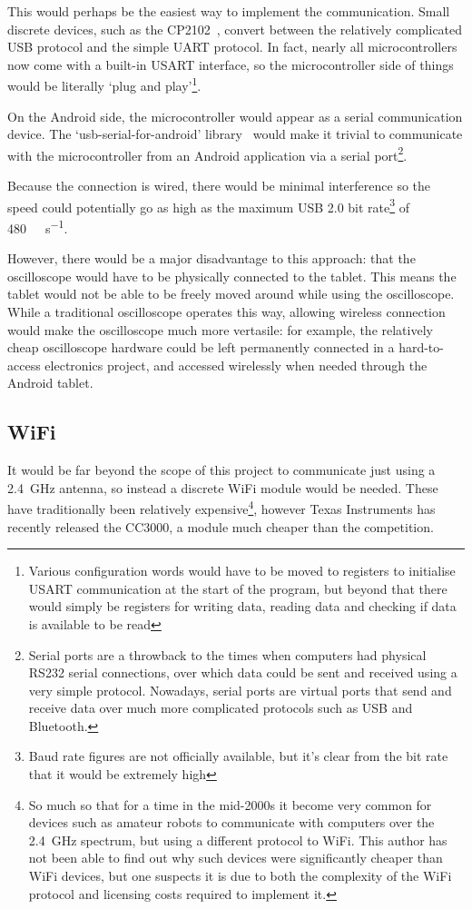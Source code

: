 This would perhaps be the easiest way to implement the communication. Small
discrete devices, such as the CP2102~\autocite{CP2102}, convert between the
relatively complicated USB protocol and the simple UART protocol. In fact,
nearly all microcontrollers now come with a built-in USART interface, so the
microcontroller side of things would be literally `plug and
play'\footnote{Various configuration words would have to be moved to registers
to initialise USART communication at the start of the program, but beyond that
there would simply be registers for writing data, reading data and checking if
data is available to be read}.

On the Android side, the microcontroller would appear as a serial communication
device. The `usb-serial-for-android' library~\autocite{AndroidUSBSerial} would
make it trivial to communicate with the microcontroller from an Android
application via a serial port\footnote{Serial ports are a throwback to the times
when computers had physical RS232 serial connections, over which data could be
sent and received using a very simple protocol. Nowadays, serial ports are
virtual ports that send and receive data over much more complicated protocols
such as USB and Bluetooth.}.

Because the connection is wired, there would be minimal interference so the
speed could potentially go as high as the maximum USB 2.0 bit rate\footnote{Baud
rate figures are not officially available, but it's clear from the bit rate that
it would be extremely high} of \SI{480}{\mega\bit\per\second}.

However, there would be a major disadvantage to this approach: that the
oscilloscope would have to be physically connected to the tablet. This means the
tablet would not be able to be freely moved around while using the oscilloscope.
While a traditional oscilloscope operates this way, allowing wireless connection
would make the oscilloscope much more vertasile: for example, the relatively
cheap oscilloscope hardware could be left permanently connected in a
hard-to-access electronics project, and accessed wirelessly when needed through
the Android tablet.

\subsection*{WiFi}

It would be far beyond the scope of this project to communicate just using a
\SI{2.4}{\GHz} antenna, so instead a discrete WiFi module would be needed. These
have traditionally been relatively expensive\footnote{So much so that for a time
in the mid-2000s it become very common for devices such as amateur robots to
communicate with computers over the \SI{2.4}{\GHz} spectrum, but using a
different protocol to WiFi. This author has not been able to find out why such
devices were significantly cheaper than WiFi devices, but one suspects it is due
to both the complexity of the WiFi protocol and licensing costs required to
implement it.}, however Texas Instruments has recently released the CC3000, a
module much cheaper than the competition.~\autocite{CC3000Cheap}

